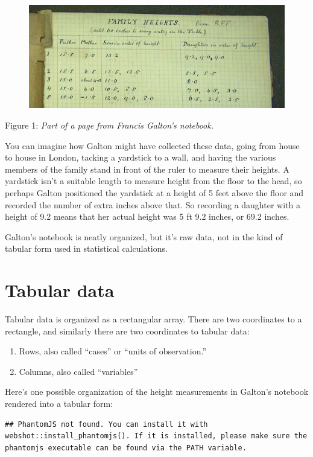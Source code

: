 \documentclass[]{book}
\providecommand{\tightlist}{%
  \setlength{\itemsep}{0pt}\setlength{\parskip}{0pt}}
\theoremstyle{definition}
\theoremstyle{definition}
\theoremstyle{definition}
\theoremstyle{remark}
\begin{document}
\begin{figure}
\centering
\includegraphics{images/galton-notebook.jpg}
\caption{}
\end{figure}

Figure 1: \emph{Part of a page from Francis Galton's notebook.}

You can imagine how Galton might have collected these data, going from
house to house in London, tacking a yardstick to a wall, and having the
various members of the family stand in front of the ruler to measure
their heights. A yardstick isn't a suitable length to measure height
from the floor to the head, so perhaps Galton positioned the yardstick
at a height of 5 feet above the floor and recorded the number of extra
inches above that. So recording a daughter with a height of 9.2 means
that her actual height was 5 ft 9.2 inches, or 69.2 inches.

Galton's notebook is neatly organized, but it's raw data, not in the
kind of tabular form used in statistical calculations.

\section{Tabular data}\label{tabular-data}

Tabular data is organized as a rectangular array. There are two
coordinates to a rectangle, and similarly there are two coordinates to
tabular data:

\begin{enumerate}
\def\labelenumi{\arabic{enumi}.}
\tightlist
\item
  Rows, also called ``cases'' or ``units of observation.''
\item
  Columns, also called ``variables''
\end{enumerate}

Here's one possible organization of the height measurements in Galton's
notebook rendered into a tabular form:

\begin{verbatim}
## PhantomJS not found. You can install it with webshot::install_phantomjs(). If it is installed, please make sure the phantomjs executable can be found via the PATH variable.
\end{verbatim}
\end{document}
